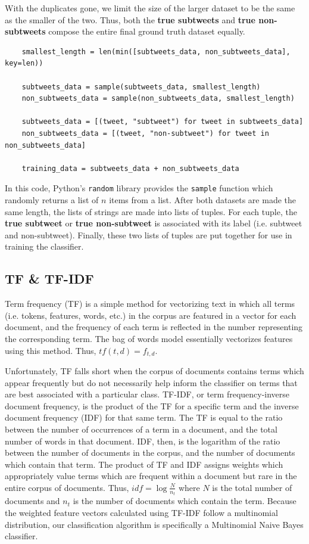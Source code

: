 \documentclass[11pt, twoside, reqno]{book}
\begin{document}
\noindent
With the duplicates gone, we limit the size of the larger dataset to be the same as the smaller of the two. Thus, both the \textbf{true subtweets} and \textbf{true non-subtweets} compose the entire final ground truth dataset equally.

\begin{verbatim}
	smallest_length = len(min([subtweets_data, non_subtweets_data], key=len))
	
	subtweets_data = sample(subtweets_data, smallest_length)
	non_subtweets_data = sample(non_subtweets_data, smallest_length)
	
	subtweets_data = [(tweet, "subtweet") for tweet in subtweets_data]
	non_subtweets_data = [(tweet, "non-subtweet") for tweet in non_subtweets_data]
	
	training_data = subtweets_data + non_subtweets_data
\end{verbatim}

\noindent
In this code, Python's \verb|random| library provides the \verb|sample| function which randomly returns a list of $n$ items from a list. After both datasets are made the same length, the lists of strings are made into lists of tuples. For each tuple, the \textbf{true subtweet} or \textbf{true non-subtweet} is associated with its label (i.e. subtweet and non-subtweet). Finally, these two lists of tuples are put together for use in training the classifier.

\subsection{TF \& TF-IDF}
\label{tf_tf_idf}

Term frequency (TF) is a simple method for vectorizing text in which all terms (i.e. tokens, features, words, etc.) in the corpus are featured in a vector for each document, and the frequency of each term is reflected in the number representing the corresponding term. The bag of words model essentially vectorizes features using this method. Thus, $tf(t,d)=f_{t,d}$.

Unfortunately, TF falls short when the corpus of documents contains terms which appear frequently but do not necessarily help inform the classifier on terms that are best associated with a particular class. TF-IDF, or term frequency-inverse document frequency, is the product of the TF for a specific term and the inverse document frequency (IDF) for that same term. The TF is equal to the ratio between the number of occurrences of a term in a document, and the total number of words in that document. IDF, then, is the logarithm of the ratio between the number of documents in the corpus, and the number of documents which contain that term. The product of TF and IDF assigns weights which appropriately value terms which are frequent within a document but rare in the entire corpus of documents. Thus, $idf=\log\frac{N}{n_{t}}$ where $N$ is the total number of documents and $n_{t}$ is the number of documents which contain the term. Because the weighted feature vectors calculated using TF-IDF follow a multinomial distribution, our classification algorithm is specifically a Multinomial Naive Bayes classifier.
\end{document}
